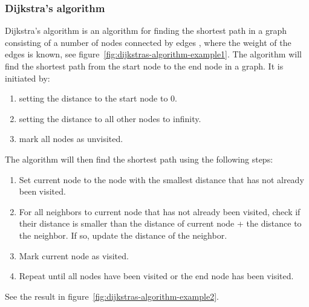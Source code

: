 \documentclass {article}
\begin{document}
\subsubsection{Dijkstra's algorithm}
Dijkstra's algorithm is an algorithm for finding the shortest path in a graph consisting of a number of nodes connected by edges \cite{weiss}, where the weight of the edges is known, see figure~\ref{fig:dijkstras-algorithm-example1}. The algorithm will find the shortest path from the start node to the end node in a graph. It is initiated by:
\begin{enumerate}
\item setting the distance to the start node to 0.
\item setting the distance to all other nodes to infinity.
\item mark all nodes as unvisited.
\end{enumerate}
The algorithm will then find the shortest path using the following steps:
\begin{enumerate}
\item Set current node to the node with the smallest distance that has not already been visited.
\item For all neighbors to current node that has not already been visited, check if their distance is smaller than the distance of current node + the distance to the neighbor. If so, update the distance of the neighbor.
\item Mark current node as visited.
\item Repeat until all nodes have been visited or the end node has been visited.
\end{enumerate}
See the result in figure~\ref{fig:dijkstras-algorithm-example2}.
\end{document}
